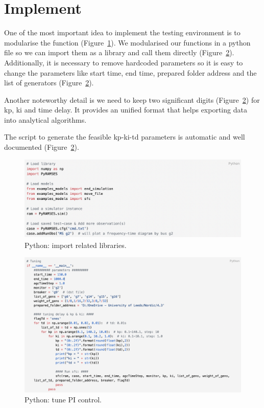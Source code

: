 \section{Implement} %

One of the most important idea to implement the testing environment is to modularise the function (Figure~\ref{4_3_code1}). We modularised our functions in a python file so we can import them as a library and call them directly (Figure~\ref{4_3_code2}). Additionally, it is necessary to remove hardcoded parameters so it is easy to change the parameters like start time, end time, prepared folder address and the list of generators (Figure~\ref{4_3_code2}).

Another noteworthy detail is we need to keep two significant digits (Figure~\ref{4_3_code2}) for kp, ki and time delay. It provides an unified format that helps exporting data into analytical algorithms.

The script to generate the feasible kp-ki-td parameters is automatic and well documented (Figure~\ref{4_3_code2}).

\begin{figure}[htbp]
\centering
\includegraphics[width = \textwidth]{figure/4_3_code1.png}
\caption{Python: import related libraries.}
\label{4_3_code1}
\end{figure}

\begin{figure}[htbp]
\centering
\includegraphics[width = \textwidth]{figure/4_3_code2.png}
\caption{Python: tune PI control.}
\label{4_3_code2}
\end{figure}